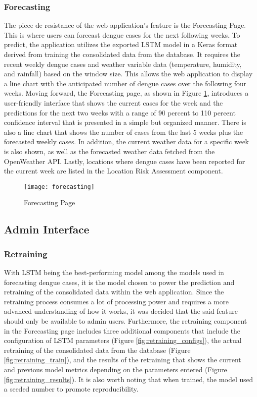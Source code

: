 \subsubsection{Forecasting}

The piece de resistance of the web application's feature is the Forecasting Page. This is where users can forecast dengue cases for the next following weeks. To predict, the application utilizes the exported LSTM model in a Keras format derived from training the consolidated data from the database. It requires the recent weekly dengue cases and weather variable data (temperature, humidity, and rainfall) based on the window size. This allows the web application to display a line chart with the anticipated number of dengue cases over the following four weeks. Moving forward, the Forecasting page, as shown in Figure \ref{fig:forecasting}, introduces a user-friendly interface that shows the current cases for the week and the predictions for the next two weeks with a range of 90 percent to 110 percent confidence interval that is presented in a simple but organized manner. There is also a line chart that shows the number of cases from the last 5 weeks plus the forecasted weekly cases. In addition, the current weather data for a specific week is also shown, as well as the forecasted weather data fetched from the OpenWeather API. Lastly, locations where dengue cases have been reported for the current week are listed in the Location Risk Assessment component. 

\begin{figure}[H]
	\centering
	\texttt{[image: forecasting]}
	\caption{Forecasting Page}
	\label{fig:forecasting}
\end{figure}

\subsection{Admin Interface}

\subsubsection{Retraining}

With LSTM being the best-performing model among the models used in forecasting dengue cases, it is the model chosen to power the prediction and retraining of the consolidated data within the web application. Since the retraining process consumes a lot of processing power and requires a more advanced understanding of how it works, it was decided that the said feature should only be available to admin users. Furthermore, the retraining component in the Forecasting page includes three additional components that include the configuration of LSTM parameters (Figure \ref{fig:retraining_configs}), the actual retraining of the consolidated data from the database (Figure \ref{fig:retraining_train}), and the results of the retraining that shows the current and previous model metrics depending on the parameters entered (Figure \ref{fig:retraining_results}). It is also worth noting that when trained, the model used a seeded number to promote reproducibility. 


